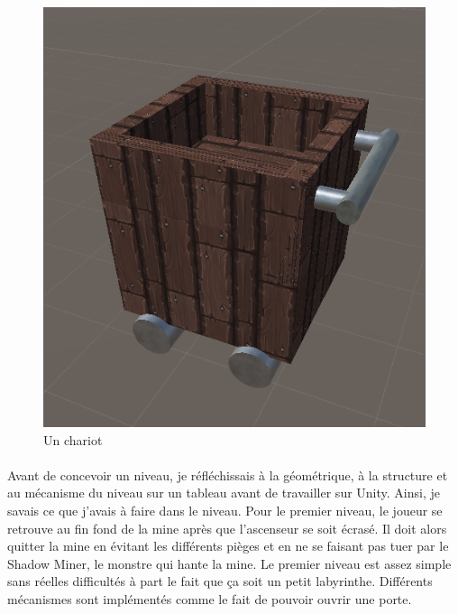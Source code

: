 \documentclass[titlepage, 13px, a4paper]{report}
\begin{document}
\begin{figure}[h!]
  \centering
  \includegraphics[scale=0.34]{images/clement_chariot.png}
  \caption{Un chariot}
\end{figure}

\newpage

\paragraph*{} \hspace{0pt}
Avant de concevoir un niveau, je réfléchissais à la géométrique, à la structure et au 
mécanisme du niveau sur un tableau avant de travailler sur Unity. Ainsi, je savais ce 
que j'avais à faire dans le niveau. Pour le premier niveau, le joueur se retrouve au fin 
fond de la mine après que l'ascenseur se soit écrasé. Il doit alors quitter la mine en 
évitant les différents pièges et en ne se faisant pas tuer par le Shadow Miner, le monstre 
qui hante la mine. Le premier niveau est assez simple sans réelles difficultés à part le fait 
que ça soit un petit labyrinthe. Différents mécanismes sont implémentés comme le fait de 
pouvoir ouvrir une porte. \\
\end{document}

